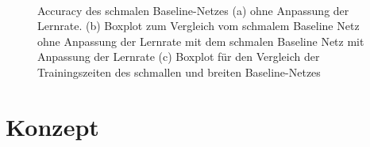 \begin{figure}
     \centering
     \\
     \caption{Accuracy des schmalen Baseline-Netzes  (a) ohne Anpassung der Lernrate. (b) Boxplot zum Vergleich vom schmalem Baseline Netz ohne Anpassung der Lernrate mit dem schmalen Baseline Netz mit Anpassung der Lernrate (c) Boxplot für den Vergleich der Trainingszeiten des schmallen und breiten Baseline-Netzes}
     \label{abb:BaseAccS}
\end{figure}



\section{Konzept}\label{sec:konzept}

